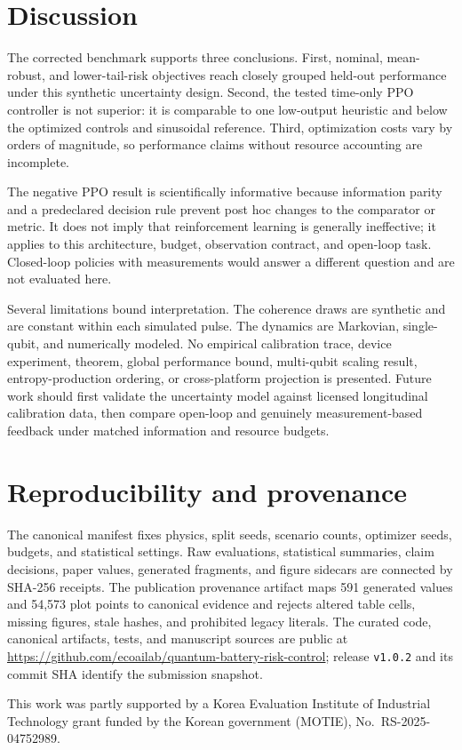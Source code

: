 \documentclass[preprint,aps,pra,superscriptaddress,longbibliography]{revtex4-2}
\begin{document}
\section{Discussion}
The corrected benchmark supports three conclusions.  First, nominal, mean-robust, and lower-tail-risk objectives reach closely grouped held-out performance under this synthetic uncertainty design.  Second, the tested time-only PPO controller is not superior: it is comparable to one low-output heuristic and below the optimized controls and sinusoidal reference.  Third, optimization costs vary by orders of magnitude, so performance claims without resource accounting are incomplete.

The negative PPO result is scientifically informative because information parity and a predeclared decision rule prevent post hoc changes to the comparator or metric.  It does not imply that reinforcement learning is generally ineffective; it applies to this architecture, budget, observation contract, and open-loop task.  Closed-loop policies with measurements would answer a different question and are not evaluated here.

Several limitations bound interpretation.  The coherence draws are synthetic and are constant within each simulated pulse.  The dynamics are Markovian, single-qubit, and numerically modeled.  No empirical calibration trace, device experiment, theorem, global performance bound, multi-qubit scaling result, entropy-production ordering, or cross-platform projection is presented.  Future work should first validate the uncertainty model against licensed longitudinal calibration data, then compare open-loop and genuinely measurement-based feedback under matched information and resource budgets.

\section{Reproducibility and provenance}
The canonical manifest fixes physics, split seeds, scenario counts, optimizer seeds, budgets, and statistical settings.  Raw evaluations, statistical summaries, claim decisions, paper values, generated fragments, and figure sidecars are connected by SHA-256 receipts.  The publication provenance artifact maps 591 generated values and 54,573 plot points to canonical evidence and rejects altered table cells, missing figures, stale hashes, and prohibited legacy literals.  The curated code, canonical artifacts, tests, and manuscript sources are public at \url{https://github.com/ecoailab/quantum-battery-risk-control}; release \texttt{v1.0.2} and its commit SHA identify the submission snapshot.

\begin{acknowledgments}
This work was partly supported by a Korea Evaluation Institute of Industrial Technology grant funded by the Korean government (MOTIE), No.~RS-2025-04752989.
\end{acknowledgments}



\end{document}
